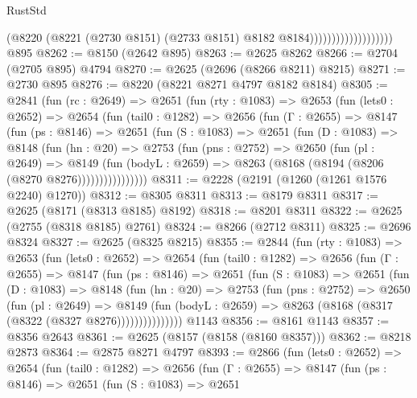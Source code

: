 \begin{lexlean}{RustStd}
\begin{coremodule}
                                      (@8220
                                        (@8221
                                          (@2730 @8151)
                                          (@2733 @8151)
                                          @8182
                                          @8184)))))))))))))))))))
    @895
@8262 := @8150 (@2642 @895)
@8263 := @2625 @8262
@8266 := @2704 (@2705 @895) @4794
@8270 := @2625 (@2696 (@8266 @8211) @8215)
@8271 := @2730 @895
@8276 := @8220 (@8221 @8271 @4797 @8182 @8184)
@8305 := @2841
    (fun (rc : @2649) =>
    @2651
      (fun (rty : @1083) =>
      @2653
        (fun (lets0 : @2652) =>
        @2654
          (fun (tail0 : @1282) =>
          @2656
            (fun (Γ : @2655) =>
            @8147
              (fun (ps : @8146) =>
              @2651
                (fun (S : @1083) =>
                @2651
                  (fun (D : @1083) =>
                  @8148
                    (fun (hn : @20) =>
                    @2753
                      (fun (pns : @2752) =>
                      @2650
                        (fun (pl : @2649) =>
                        @8149
                          (fun (bodyL : @2659) =>
                          @8263 (@8168 (@8194 (@8206 (@8270 @8276))))))))))))))))
@8311 := @2228 (@2191 (@1260 (@1261 @1576 @2240) @1270))
@8312 := @8305 @8311
@8313 := @8179 @8311
@8317 := @2625 (@8171 (@8313 @8185) @8192)
@8318 := @8201 @8311
@8322 := @2625 (@2755 (@8318 @8185) @2761)
@8324 := @8266 (@2712 @8311)
@8325 := @2696 @8324
@8327 := @2625 (@8325 @8215)
@8355 := @2844
    (fun (rty : @1083) =>
    @2653
      (fun (lets0 : @2652) =>
      @2654
        (fun (tail0 : @1282) =>
        @2656
          (fun (Γ : @2655) =>
          @8147
            (fun (ps : @8146) =>
            @2651
              (fun (S : @1083) =>
              @2651
                (fun (D : @1083) =>
                @8148
                  (fun (hn : @20) =>
                  @2753
                    (fun (pns : @2752) =>
                    @2650
                      (fun (pl : @2649) =>
                      @8149
                        (fun (bodyL : @2659) =>
                        @8263 (@8168 (@8317 (@8322 (@8327 @8276)))))))))))))))
    @1143
@8356 := @8161 @1143
@8357 := @8356 @2643
@8361 := @2625 (@8157 (@8158 (@8160 @8357)))
@8362 := @8218 @2873
@8364 := @2875 @8271 @4797
@8393 := @2866
    (fun (lets0 : @2652) =>
    @2654
      (fun (tail0 : @1282) =>
      @2656
        (fun (Γ : @2655) =>
        @8147
          (fun (ps : @8146) =>
          @2651
            (fun (S : @1083) =>
            @2651

\end{coremodule}
\end{lexlean}
